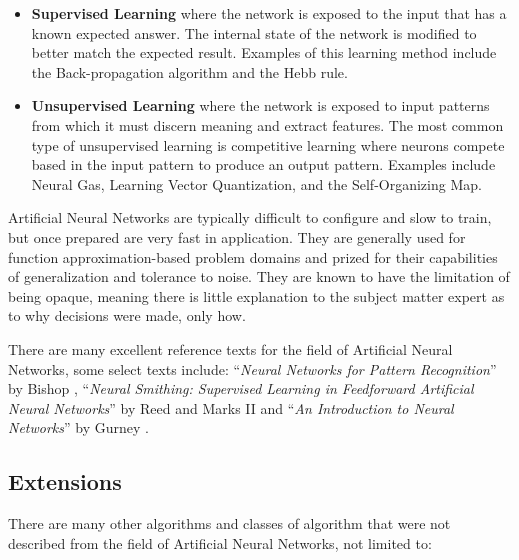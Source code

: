 \begin{bibunit}
\begin{itemize}
	\item \textbf{Supervised Learning} where the network is exposed to the input that has a known expected answer. The internal state of the network is modified to better match the expected result. Examples of this learning method include the Back-propagation algorithm and the Hebb rule.
	\item \textbf{Unsupervised Learning} where the network is exposed to input patterns from which it must discern meaning and extract features. The most common type of unsupervised learning is competitive learning where neurons compete based in the input pattern to produce an output pattern. Examples include Neural Gas, Learning Vector Quantization, and the Self-Organizing Map.
\end{itemize}

Artificial Neural Networks are typically difficult to configure and slow to train, but once prepared are very fast in application. They are generally used for function approximation-based problem domains and prized for their capabilities of generalization and tolerance to noise. They are known to have the limitation of being opaque, meaning there is little explanation to the subject matter expert as to why decisions were made, only how.



There are many excellent reference texts for the field of Artificial Neural Networks, some select texts include: ``\emph{Neural Networks for Pattern Recognition}'' by Bishop \cite{Bishop1995}, ``\emph{Neural Smithing: Supervised Learning in Feedforward Artificial Neural Networks}'' by Reed and Marks II \cite{Reed1999} and ``\emph{An Introduction to Neural Networks}'' by Gurney \cite{Gurney1997}.


% 
% 
\subsection{Extensions}
There are many other algorithms and classes of algorithm that were not described from the field of Artificial Neural Networks, not limited to:


\end{bibunit}
